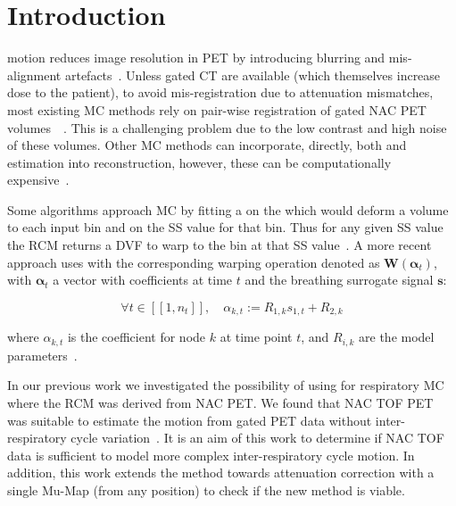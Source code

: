 \section{Introduction} \label{sec:introduction}
     motion reduces image resolution in \gls{PET} by introducing blurring and mis-alignment artefacts~\cite{Nehmeh2008a}. Unless gated \gls{CT} are available (which themselves increase dose to the patient), to avoid mis-registration due to attenuation mismatches, most existing \gls{MC} methods rely on pair-wise registration of gated \gls{NAC} \gls{PET} volumes~\cite{LungMotionDiaphragmBaiBib}~\cite{Oliveira2014}. This is a challenging problem due to the low contrast and high noise of these volumes. Other \gls{MC} methods can incorporate, directly, both  and  estimation into reconstruction, however, these can be computationally expensive~\cite{Bousse2016b}.
    
    Some  algorithms approach \gls{MC} by fitting a  on the  which would deform a  volume  to each input bin and on the \gls{SS} value for that bin. Thus for any given \gls{SS} value the \gls{RCM} returns a \gls{DVF} to warp  to the bin at that \gls{SS} value~\cite{McClelland2013}. A more recent approach uses  with the corresponding warping operation denoted as $\mathbf{W}(\mathbf{\alpha}_t)$, with $\mathbf{\alpha}_t$ a vector with coefficients at time $t$ and the breathing surrogate signal $\mathbf{s}$:
    
    \begin{equation}
        \forall t \in [[1,n_t]],\quad \alpha_{k,t} := R_{1,k} s_{1,t} + R_{2,k}
    \end{equation}
    
    \noindent where $\alpha_{k,t}$ is the coefficient for node $k$ at time point $t$, and $R_{i,k}$ are the model parameters~\cite{McClelland2017}.
    
    In our previous work we investigated the possibility of using  for respiratory \gls{MC} where the \gls{RCM} was derived from \gls{NAC} \gls{PET}. We found that \gls{NAC} \gls{TOF} \gls{PET} was suitable to estimate the motion from gated PET data  without inter-respiratory cycle variation~\cite{Whitehead2019ImpactPET}. It is an aim of this work to determine if \gls{NAC} \gls{TOF} data is sufficient to model more complex inter-respiratory cycle motion. In addition, this work extends the method towards attenuation correction with a single \gls{Mu-Map} (from any position) to check if the new method is viable.

